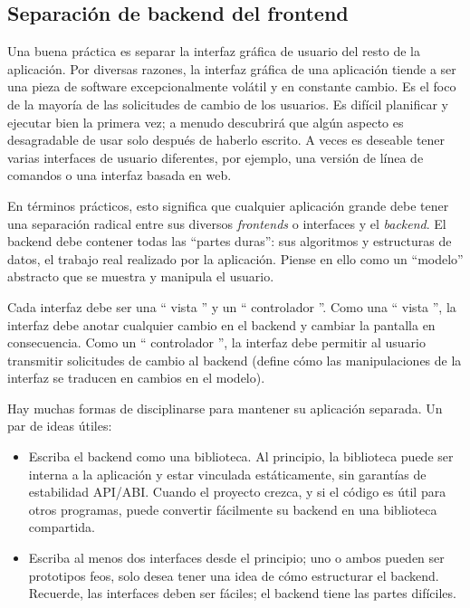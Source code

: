 \subsection{Separación de backend del frontend}
\label{intro-backend-frontend-separation}
Una buena práctica es separar la interfaz gráfica de usuario del resto de la aplicación. Por diversas razones, la interfaz gráfica de una aplicación tiende a ser una pieza de software excepcionalmente volátil y en constante cambio. Es el foco de la mayoría de las solicitudes de cambio de los usuarios. Es difícil planificar y ejecutar bien la primera vez; a menudo descubrirá que algún aspecto es desagradable de usar solo después de haberlo escrito. A veces es deseable tener varias interfaces de usuario diferentes, por ejemplo, una versión de línea de comandos o una interfaz basada en web.

En términos prácticos, esto significa que cualquier aplicación grande debe tener una separación radical entre sus diversos \emph{frontends} o interfaces y el \emph{backend}. El backend debe contener todas las ``partes duras'': sus algoritmos y estructuras de datos, el trabajo real realizado por la aplicación. Piense en ello como un ``modelo'' abstracto que se muestra y manipula el usuario.

Cada interfaz debe ser una `` vista '' y un `` controlador ''. Como una `` vista '', la interfaz debe anotar cualquier cambio en el backend y cambiar la pantalla en consecuencia. Como un `` controlador '', la interfaz debe permitir al usuario transmitir solicitudes de cambio al backend (define cómo las manipulaciones de la interfaz se traducen en cambios en el modelo).

Hay muchas formas de disciplinarse para mantener su aplicación separada. Un par de ideas útiles:

\begin{itemize}
    \item Escriba el backend como una biblioteca. Al principio, la biblioteca puede ser interna a la aplicación y estar vinculada estáticamente, sin garantías de estabilidad API/ABI. Cuando el proyecto crezca, y si el código es útil para otros programas, puede convertir fácilmente su backend en una biblioteca compartida.
    \item Escriba al menos dos interfaces desde el principio; uno o ambos pueden ser prototipos feos, solo desea tener una idea de cómo estructurar el backend. Recuerde, las interfaces deben ser fáciles; el backend tiene las partes difíciles.
\end{itemize}

